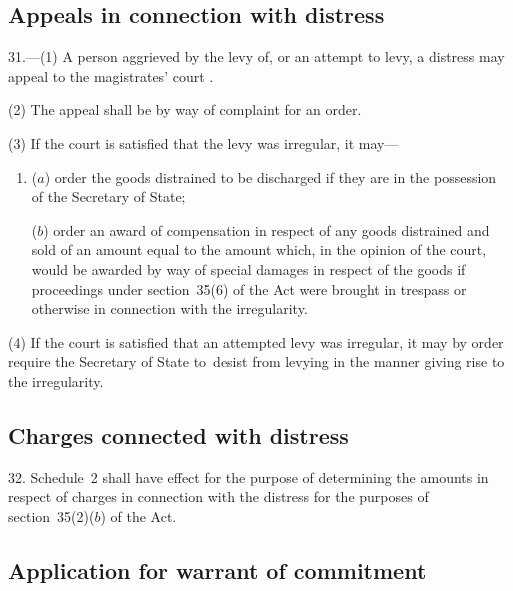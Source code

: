 \documentclass[12pt,a4paper]{article}
\begin{document}
\subsection[31. Appeals in connection with distress]{Appeals in connection with distress}

31.—(1) A person aggrieved by the levy of, or an attempt to levy, a distress may appeal to the magistrates' court%
.

(2) The appeal shall be by way of complaint for an order.

(3) If the court is satisfied that the levy was irregular, it may—
\begin{enumerate}\item[]
($a$) order the goods distrained to be discharged if they are in the possession of the Secretary of State;

($b$) order an award of compensation in respect of any goods distrained and sold of an amount equal to the amount which, in the opinion of the court, would be awarded by way of special damages in respect of the goods if proceedings under section~35(6) of the Act were brought in trespass or otherwise in connection with the irregularity.
\end{enumerate}

(4) If the court is satisfied that an attempted levy was irregular, it may by order require the Secretary of State to~desist from levying in the manner giving rise to the irregularity.


\subsection[32. Charges connected with distress]{Charges connected with distress}

32.  Schedule~2 shall have effect for the purpose of determining the amounts in respect of charges in connection with the distress for the purposes of section~35(2)($b$) of the Act.

\subsection[33. Application for warrant of commitment]{Application for warrant of commitment}
\end{document}

